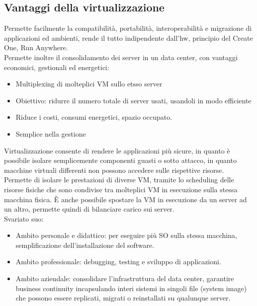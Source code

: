\documentclass{article}
\begin{document}
\subsection{Vantaggi della virtualizzazione}
Permette facilmente la compatibilità, portabilità, interoperabilità e migrazione di applicazioni ed ambienti, rende il tutto indipendente dall'hw, principio del Create One, Run Anywhere.\\ Permette inoltre il consolidamento dei server in un data center, con vantaggi economici, gestionali ed energetici:
\begin{itemize}
\item Multiplexing di molteplici VM sullo etsso server
\item Obiettivo: ridurre il numero totale di server usati, usandoli in modo efficiente
\item Riduce i costi, consumi energetici, spazio occupato.
\item Semplice nella gestione
\end{itemize}
Virtualizzazione consente di rendere le applicazioni più sicure, in quanto è possibile isolare semplicemente componenti guasti o sotto attacco, in quanto macchine virtuali differenti non possono accedere sulle rispettive risorse.\\ Permette di isolare le prestazioni di diverse VM, tramite lo scheduling delle risorse fisiche che sono condivise tra molteplici VM in esecuzione sulla stessa macchina fisica. È anche possibile spostare la VM in esecuzione da un server ad un altro, permette quindi di bilanciare carico sui server.\\ Svariato suo:
\begin{itemize}
\item Ambito personale e didattico: per eseguire più SO sulla stessa macchina, semplificazione dell'installazione del software.
\item Ambito professionale: debugging, testing e sviluppo di applicazioni.
\item Ambito aziendale: consolidare l'infrastruttura del data center, garantire business continuity incapsulando interi sistemi in singoli file (system image) che possono essere replicati, migrati o reinstallati su qualunque server. 
\end{itemize}
\end{document}
